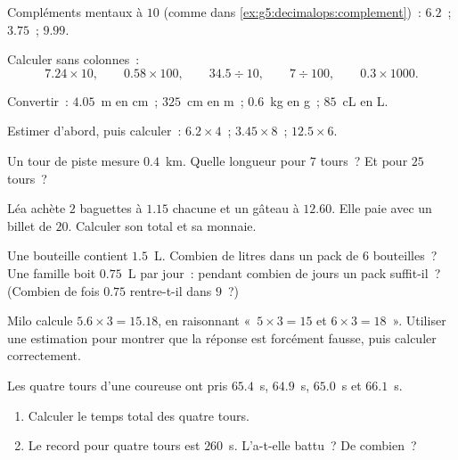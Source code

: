 \begin{exercise}[$\star$]\label{exo:g5:decimalops:3}
Compléments mentaux à $10$ (comme dans
\cref{ex:g5:decimalops:complement})~: $6.2$~; \quad $3.75$~; \quad
$9.99$.
\end{exercise}

\begin{exercise}[$\star$]\label{exo:g5:decimalops:4}
Calculer sans colonnes~:
\[
7.24 \times 10, \qquad
0.58 \times 100, \qquad
34.5 \div 10, \qquad
7 \div 100, \qquad
0.3 \times 1000 .
\]
\end{exercise}

\begin{exercise}[$\star$]\label{exo:g5:decimalops:5}
Convertir~: $4.05$~m en cm~; \quad $325$~cm en m~; \quad $0.6$~kg
en g~; \quad $85$~cL en L.
\end{exercise}

\begin{exercise}[$\star$]\label{exo:g5:decimalops:6}
Estimer d'abord, puis calculer~: $6.2 \times 4$~; \quad
$3.45 \times 8$~; \quad $12.5 \times 6$.
\end{exercise}

\begin{exercise}[$\star$]\label{exo:g5:decimalops:7}
Un tour de piste mesure $0.4$~km. Quelle longueur pour $7$ tours~?
Et pour $25$ tours~?
\end{exercise}

\begin{exercise}[$\star$]\label{exo:g5:decimalops:8}
Léa achète $2$ baguettes à $1.15$ chacune et un gâteau à $12.60$.
Elle paie avec un billet de $20$. Calculer son total et sa monnaie.
\end{exercise}

\begin{exercise}[$\star$]\label{exo:g5:decimalops:9}
Une bouteille contient $1.5$~L. Combien de litres dans un pack de
$6$ bouteilles~? Une famille boit $0.75$~L par jour~: pendant
combien de jours un pack suffit-il~? (Combien de fois $0.75$
rentre-t-il dans $9$~?)
\end{exercise}

\begin{exercise}[$\star\star$]\label{exo:g5:decimalops:10}
Milo calcule $5.6 \times 3 = 15.18$, en raisonnant «~$5 \times 3 = 15$
et $6 \times 3 = 18$~». Utiliser une estimation pour montrer que la
réponse est forcément fausse, puis calculer correctement.
\end{exercise}

\begin{exercise}[$\star\star$]\label{exo:g5:decimalops:11}
Les quatre tours d'une coureuse ont pris $65.4$~s, $64.9$~s,
$65.0$~s et $66.1$~s.
\begin{enumerate}
  \item Calculer le temps total des quatre tours.
  \item Le record pour quatre tours est $260$~s. L'a-t-elle battu~?
        De combien~?
\end{enumerate}
\end{exercise}

